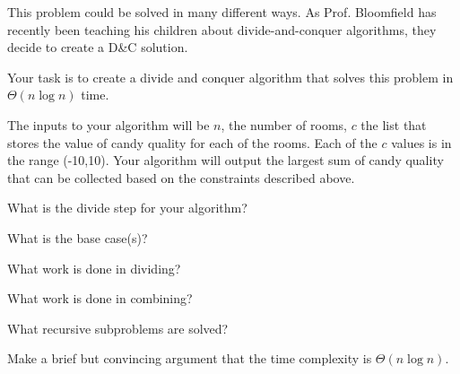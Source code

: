 \documentclass[10pt]{article}
\begin{document}
This problem could be solved in many different ways. As Prof. Bloomfield has recently been teaching his children about divide-and-conquer algorithms, they decide to create a D\&C solution.

Your task is to create a divide and conquer algorithm that solves this problem in $\Theta(n \log n)$ time.

The inputs to your algorithm will be $n$, the number of rooms, $c$ the list that stores the value of candy quality for each of the rooms. Each of the $c$ values is in the range (-10,10). Your algorithm will output the largest sum of candy quality that can be collected based on the constraints described above.

\vspace{0.25in}

What is the divide step for your algorithm?

\solution{

}
\vspace{0.25in}

What is the base case(s)?

\solution{

}
\vspace{0.25in}

What work is done in dividing?

\solution{

}
\vspace{0.25in}

What work is done in combining?

\solution{

}
\vspace{0.25in}

What recursive subproblems are solved?

\solution{

}
\vspace{0.25in}

Make a brief but convincing argument that the time complexity is $\Theta(n \log n)$.

\solution{

}


\end{document}

